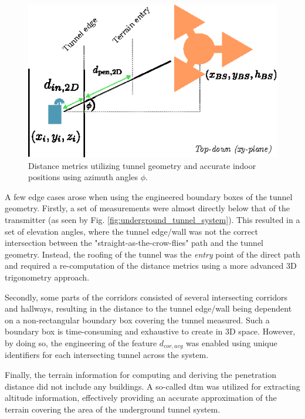\begin{figure}
    \centering
    \includegraphics{chapters/part_pathloss/figures/outdoor_to_indoor/inside_distance_illustration_xyplane.eps}
    \caption{Distance metrics utilizing tunnel geometry and accurate indoor positions using azimuth angles $\phi$.}
    \label{fig:inside_distance_xy}
\end{figure}

\noindent A few edge cases arose when using the engineered boundary boxes of the tunnel geometry. Firstly, a set of measurements were almost directly below that of the transmitter (as seen by Fig. \ref{fig:underground_tunnel_system}). This resulted in a set of elevation angles, where the tunnel edge/wall was not the correct intersection between the "straight-as-the-crow-flies" path and the tunnel geometry. Instead, the roofing of the tunnel was the \emph{entry} point of the direct path and required a re-computation of the distance metrics using a more advanced $3$D trigonometry approach. 

Secondly, some parts of the corridors consisted of several intersecting corridors and hallways, resulting in the distance to the tunnel edge/wall being dependent on a non-rectangular boundary box covering the tunnel measured. Such a boundary box is time-consuming and exhaustive to create in $3$D space. However, by doing so, the engineering of the feature $d_{cor,avg}$ was enabled using unique identifiers for each intersecting tunnel across the system.

Finally, the terrain information for computing and deriving the penetration distance did not include any buildings. A so-called \gls{dtm} \cite{kortforsyningen} was utilized for extracting altitude information, effectively providing an accurate approximation of the terrain covering the area of the underground tunnel system.


